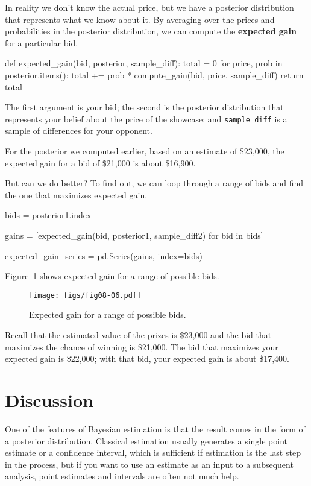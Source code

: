 \documentclass[12pt]{book}
\theoremstyle{exercise}
\newcommand{\py}[1]{{\tt #1}}%
\begin{document}
In reality we don't know the actual price, but we have a posterior distribution that represents what we know about it.
By averaging over the prices and probabilities in the posterior distribution, we can compute the {\bf expected gain} for a particular bid.

\begin{code}
def expected_gain(bid, posterior, sample_diff):
    total = 0
    for price, prob in posterior.items():
        total += prob * compute_gain(bid, price, sample_diff)
    return total
\end{code}

The first argument is your bid; the second is the posterior distribution that represents your belief about the price of the showcase; and \py{sample_diff} is a sample of differences for your opponent.

For the posterior we computed earlier, based on an estimate of \$23,000,
the expected gain for a bid of \$21,000
is about \$16,900.

But can we do better?
To find out, we can loop through a range of bids and find the one that maximizes expected gain.

\begin{code}
bids = posterior1.index

gains = [expected_gain(bid, posterior1, sample_diff2) for bid in bids]

expected_gain_series = pd.Series(gains, index=bids)
\end{code}

Figure~\ref{fig08-06} shows expected gain for a range of possible bids.

\begin{figure}
\centerline{\texttt{[image: figs/fig08-06.pdf]}}
\caption{Expected gain for a range of possible bids.}
\label{fig08-06}
\end{figure}

Recall that the estimated value of the prizes is \$23,000 and the bid that maximizes the chance of winning is \$21,000.
The bid that maximizes your expected gain is \$22,000; with that bid, your expected gain is about \$17,400.


\section{Discussion}

One of the features of Bayesian estimation is that the
result comes in the form of a posterior distribution.  Classical
estimation usually generates a single point estimate or a confidence
interval, which is sufficient if estimation is the last step in the
process, but if you want to use an estimate as an input to a
subsequent analysis, point estimates and intervals are often not much
help.
\end{document}
